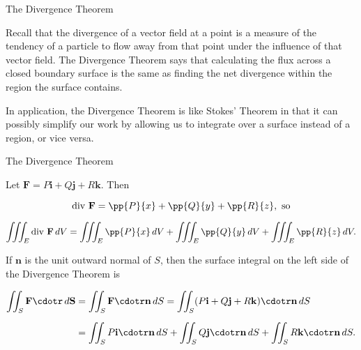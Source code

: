 \documentclass[11pt,english,
handout
]{beamer}
\begin{document}
\begin{frame}[t]{The Divergence Theorem}
\small
{}

Recall that the divergence of a vector field at a point is a measure of the tendency of a particle to flow away from that point under the influence of that vector field. \pause The Divergence Theorem says that calculating the flux across a closed boundary surface is the same as finding the net divergence within the region the surface contains.\pause


In application, the Divergence Theorem is like Stokes' Theorem in that it can possibly simplify our work by allowing us to integrate over a surface instead of a region, or vice versa.
\end{frame}
















\begin{frame}[t]{The Divergence Theorem}
\small
\begin{proofs}
Let $\mathbf{F}=P\mathbf{i}+Q\mathbf{j}+R\mathbf{k}$. \pause Then

\[
\text{div }\mathbf{F}=\pp{P}{x}+\pp{Q}{y}+\pp{R}{z},\text{ so}
\]

\[
\iiint_E\text{div }\mathbf{F}\,dV=\iiint_E\pp{P}{x}\,dV+\iiint_E\pp{Q}{y}\,dV+\iiint_E\pp{R}{z}\,dV.
\]\pause

If $\mathbf{n}$ is the unit outward normal of $S$, then the surface integral on the left side of the Divergence Theorem is

\begin{align*}
\iint_S\mathbf{F}\cdotr\,d\mathbf{S}&=\iint_S\mathbf{F}\cdotr\mathbf{n}\,dS=\iint_S(P\mathbf{i}+Q\mathbf{j}+R\mathbf{k})\cdotr\mathbf{n}\,dS\\[2mm]
&=\iint_SP\mathbf{i}\cdotr\mathbf{n}\,dS+\iint_SQ\mathbf{j}\cdotr\mathbf{n}\,dS+\iint_SR\mathbf{k}\cdotr\mathbf{n}\,dS.
\end{align*}
\end{proofs}
\end{frame}
\end{document}
